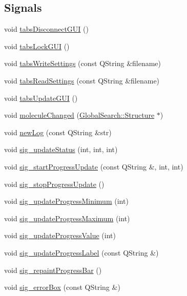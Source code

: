 \subsection*{Signals}
\begin{DoxyCompactItemize}
\item 
void \hyperlink{classGlobalSearch_1_1AbstractDialog_a3557cb9d441d0aabbd9ee3aa8cfdaea9}{tabs\+Disconnect\+G\+U\+I} ()
\item 
void \hyperlink{classGlobalSearch_1_1AbstractDialog_a93ef632734bcb7228216f5685e90e3f1}{tabs\+Lock\+G\+U\+I} ()
\item 
void \hyperlink{classGlobalSearch_1_1AbstractDialog_a17e7f95159cbbf74b44739636271bc59}{tabs\+Write\+Settings} (const Q\+String \&filename)
\item 
void \hyperlink{classGlobalSearch_1_1AbstractDialog_aac4850039323bd7bf05f048bc7e8437e}{tabs\+Read\+Settings} (const Q\+String \&filename)
\item 
void \hyperlink{classGlobalSearch_1_1AbstractDialog_aea96d15a1dcd0715e4cd2b4377f052d0}{tabs\+Update\+G\+U\+I} ()
\item 
void \hyperlink{classGlobalSearch_1_1AbstractDialog_ac9ca934578ad9620bf49b9074a2b6982}{molecule\+Changed} (\hyperlink{classGlobalSearch_1_1Structure}{Global\+Search\+::\+Structure} $\ast$)
\item 
void \hyperlink{classGlobalSearch_1_1AbstractDialog_a94fdb4c5a3ec5963f2764f0d821b2583}{new\+Log} (const Q\+String \&str)
\item 
void \hyperlink{classGlobalSearch_1_1AbstractDialog_a99f0d05314c6da0ceb54cac2fd911c00}{sig\+\_\+update\+Status} (int, int, int)
\item 
void \hyperlink{classGlobalSearch_1_1AbstractDialog_a85a70ecb4d340cfeae15c18f69419827}{sig\+\_\+start\+Progress\+Update} (const Q\+String \&, int, int)
\item 
void \hyperlink{classGlobalSearch_1_1AbstractDialog_a738c3769545f233bb38b45a4724d527d}{sig\+\_\+stop\+Progress\+Update} ()
\item 
void \hyperlink{classGlobalSearch_1_1AbstractDialog_ab4aa18927ac8220ed98cdd6367eb1416}{sig\+\_\+update\+Progress\+Minimum} (int)
\item 
void \hyperlink{classGlobalSearch_1_1AbstractDialog_a8eb81a20fe5ad425482d3400d868fa16}{sig\+\_\+update\+Progress\+Maximum} (int)
\item 
void \hyperlink{classGlobalSearch_1_1AbstractDialog_adac485f7c7d5ac013a12b183a814da95}{sig\+\_\+update\+Progress\+Value} (int)
\item 
void \hyperlink{classGlobalSearch_1_1AbstractDialog_a4201bb13ca8322d5031ad7065d9f4afd}{sig\+\_\+update\+Progress\+Label} (const Q\+String \&)
\item 
void \hyperlink{classGlobalSearch_1_1AbstractDialog_a171b7b488362e506ba05e1016d3de0b0}{sig\+\_\+repaint\+Progress\+Bar} ()
\item 
void \hyperlink{classGlobalSearch_1_1AbstractDialog_a3d14409c0c74cea8b4b3e32e3a9eb7d0}{sig\+\_\+error\+Box} (const Q\+String \&)
\end{DoxyCompactItemize}
